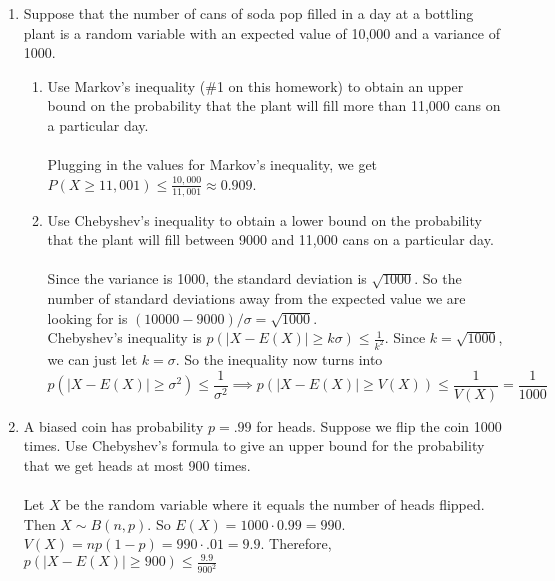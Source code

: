 \documentclass[12pt]{article}
\begin{document}
\begin{enumerate}
\medskip

\item Suppose that the number of cans of soda pop filled in a
day at a bottling plant is a random variable with an expected
value of 10,000 and a variance of 1000.
\begin{enumerate}
\item  Use Markov’s inequality (\#1 on this homework) to obtain an upper bound on the probability that the plant will fill more than 11,000 cans on a particular day.\\\\
Plugging in the values for Markov's inequality, we get $P(X \geq 11,001) \leq \frac{10,000}{11,001} \approx 0.909 $.
\item Use Chebyshev’s inequality to obtain a lower bound
on the probability that the plant will fill between 9000
and 11,000 cans on a particular day.\\\\
Since the variance is 1000, the standard deviation is $\sqrt{1000}$. So the number of standard deviations away from the expected value we are looking for is $(10000 - 9000)/\sigma = \sqrt{1000}$.\\
Chebyshev's inequality is $p(|X-E(X)|\geq k\sigma) \leq \frac{1}{k^2}$. Since $k=\sqrt{1000}$, we can just let $k=\sigma$. So the inequality now turns into
\[p(|X-E(X)|\geq \sigma^2) \leq \frac{1}{\sigma^2} \implies p(|X-E(X)|\geq V(X)) \leq \frac{1}{V(X)}=\frac{1}{1000}\]
\end{enumerate}

\medskip 

\item A biased coin has probability $p=.99$ for heads. Suppose we flip the coin 1000 times. Use Chebyshev's formula to give an upper bound for the probability that we get heads at most 900 times.\\\\
Let $X$ be the random variable where it equals the number of heads flipped. Then $X\sim B(n,p)$. So $E(X) = 1000\cdot 0.99 = 990$. $V(X) = np(1-p) = 990\cdot .01 = 9.9$. Therefore, $p(|X-E(X)|\geq 900) \leq \frac{9.9}{900^2}$
\end{enumerate}
\end{document}
